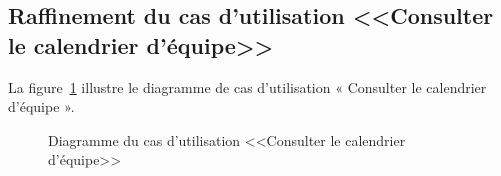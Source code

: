     \subsection{Raffinement du cas d'utilisation <<Consulter le calendrier d’équipe>>}
    La figure~\ref{fig:cal_equipe} illustre le diagramme de cas d’utilisation « Consulter le calendrier d’équipe ».
    \begin{figure}[h]
        \centering
        \caption{Diagramme du cas d'utilisation <<Consulter le calendrier d’équipe>>}
        \label{fig:cal_equipe}
    \end{figure}
    \newpage
